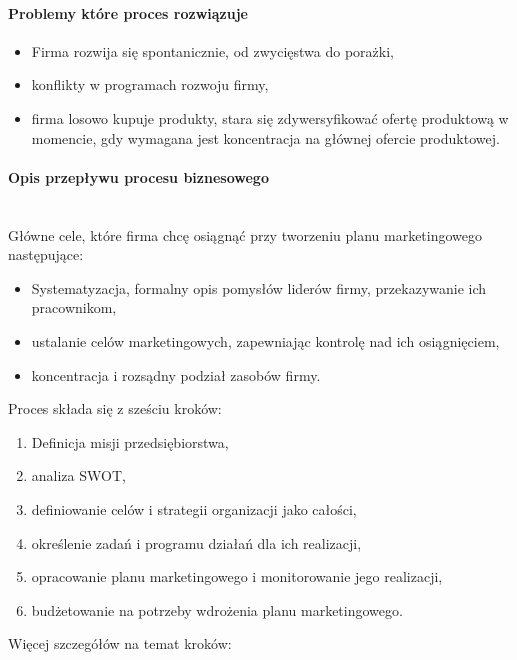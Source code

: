 \documentclass[a4paper, 12pt]{article}
\begin{document}
\paragraph{Problemy które proces rozwiązuje}
\begin{itemize}
	\item Firma rozwija się spontanicznie, od zwycięstwa do porażki,
	\item konflikty w programach rozwoju firmy,
	\item firma losowo kupuje produkty, stara się zdywersyfikować ofertę produktową w momencie, gdy wymagana jest koncentracja na głównej ofercie produktowej.
\end{itemize} 
\newpage
\paragraph{Opis przepływu procesu biznesowego}\mbox{}\\
\hspace*{1 cm} Główne cele, które firma chcę osiągnąć przy tworzeniu planu marketingowego następujące:
\begin{itemize}
	\item Systematyzacja, formalny opis pomysłów liderów firmy, przekazywanie ich pracownikom,
	\item ustalanie celów marketingowych, zapewniając kontrolę nad ich osiągnięciem,
	\item koncentracja i rozsądny podział zasobów firmy.
\end{itemize} 
\hspace*{1 cm} Proces składa się z sześciu kroków:
\begin{enumerate}
	\item Definicja misji przedsiębiorstwa,
	\item analiza SWOT,
	\item definiowanie celów i strategii organizacji jako całości,
	\item określenie zadań i programu działań dla ich realizacji,
	\item opracowanie planu marketingowego i monitorowanie jego realizacji,
	\item budżetowanie na potrzeby wdrożenia planu marketingowego.
\end{enumerate}
Więcej szczegółów na temat kroków:
\end{document}
